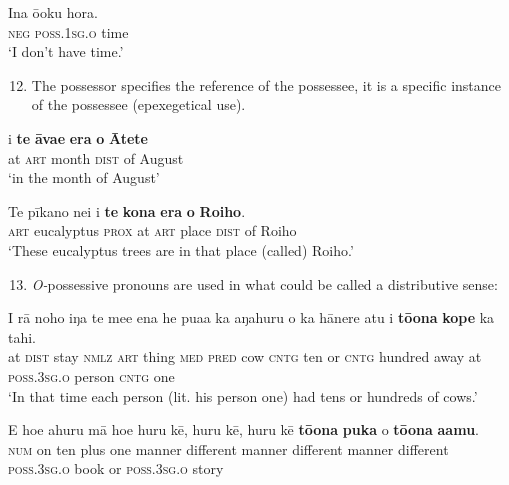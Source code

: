 \ea\label{ex:6.96}
\gll {\ꞌ}Ina ō{\ꞌ}oku hora. \\
\textsc{neg} \textsc{poss.1sg.o} time \\

\glt
‘I don’t have time.’  
\z

\begin{enumerate}
\setcounter{enumi}{11}
\item 
The possessor specifies the reference of the possessee, it is a specific instance of the possessee (epexegetical use).

\end{enumerate}

\ea\label{ex:6.97}
\gll {\ꞌ}i \textbf{te} \textbf{{\ꞌ}āva{\ꞌ}e} \textbf{era} \textbf{o} \textbf{{\ꞌ}Ātete} \\
at \textsc{art} month \textsc{dist} of August \\

\glt 
‘in the month of August’ \textstyleExampleref{[R250.063]} 
\z

\ea\label{ex:6.98}
\gll Te pīkano nei {\ꞌ}i \textbf{te} \textbf{kona} \textbf{era} \textbf{o} \textbf{Roiho}. \\
\textsc{art} eucalyptus \textsc{prox} at \textsc{art} place \textsc{dist} of Roiho \\

\glt
‘These eucalyptus trees are in that place (called) Roiho.’ \textstyleExampleref{[R130.008]} 
\z

\begin{enumerate}
\setcounter{enumi}{12}
\item 
\textit{O-}possessive pronouns are used in what could be called a distributive sense:

\end{enumerate}

\ea\label{ex:6.99}
\gll {\ꞌ}I rā noho iŋa te me{\ꞌ}e ena he pua{\ꞌ}a ka {\ꞌ}aŋahuru {\ꞌ}o ka hānere  atu i \textbf{tō{\ꞌ}ona} \textbf{kope} ka tahi.\\
at \textsc{dist} stay \textsc{nmlz} \textsc{art} thing \textsc{med} \textsc{pred} cow \textsc{cntg} ten or \textsc{cntg} hundred  away at \textsc{poss.3sg.o} person \textsc{cntg} one\\

\glt 
‘In that time each person (lit. his person one) had tens or hundreds of cows.’ \textstyleExampleref{[R107.035]} 
\z

\ea\label{ex:6.100}
\gll E ho{\ꞌ}e {\ꞌ}ahuru mā ho{\ꞌ}e huru kē, huru kē, huru kē  \textbf{tō{\ꞌ}ona} \textbf{puka} {\ꞌ}o \textbf{tō{\ꞌ}ona} \textbf{{\ꞌ}a{\ꞌ}amu}.\\
\textsc{num} on ten plus one manner different manner different manner different  \textsc{poss.3sg.o} book or \textsc{poss.3sg.o} story\\

